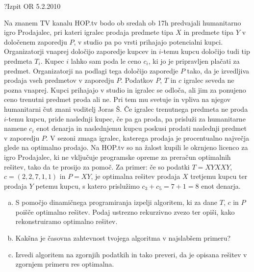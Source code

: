 \begin{naloga}{?}{Izpit OR 5.2.2010}
\begin{vprasanje}
Na znanem TV kanalu HOP.tv bodo ob sredah ob 17h
predvajali humanitarno igro Prodajalec\texttrademark,
pri kateri igralec prodaja predmete tipa $X$ in predmete tipa $Y$
v določenem zaporedju $P$,
v studio pa po vrsti prihajajo potencialni kupci.
Organizatorji vnaprej določijo zaporedje kupcev
in $i$-temu kupcu določijo tudi tip predmeta $T_i$.
Kupec $i$ lahko sam poda le ceno $c_i$,
ki jo je pripravljen plačati za predmet.
Organizatorji na podlagi tega določijo zaporedje $P$ tako,
da je izvedljiva prodaja vseh predmetov v zaporedju $P$.
Podatkov $P$, $T$ in $c$ igralec seveda ne pozna vnaprej.
Kupci prihajajo v studio in igralec se odloča,
ali jim za ponujeno ceno trenutni predmet proda ali ne.
Pri tem mu svetuje in vpliva na njegov humanitarni čut
znani voditelj Joras Š.
Če igralec trenutnega predmeta ne proda $i$-temu kupcu,
pride naslednji kupec, če pa ga proda,
pa prisluži za humanitarne namene $c_i$ enot denarja
in naslednjemu kupcu poskusi prodati naslednji predmet v zaporedju $P$.
V sezoni zmaga igralec,
katerega prodaja je procentualno največja glede na optimalno prodajo.
Na HOP.tv so na žalost kupili
le okrnjeno licenco za igro Prodajalec\texttrademark,
ki ne vključuje programske opreme za preračun optimalnih rešitev,
tako da te prosijo za pomoč.
Za primer: če so podatki $T = XYXXY$, $c = (2, 2, 7, 1, 1)$ in $P = XY$,
je optimalna rešitev prodaja $X$ tretjemu kupcu ter prodaja $Y$ petemu kupcu,
s katero prislužimo $c_3 + c_5 = 7 + 1 = 8$ enot denarja.

\begin{enumerate}[(a)]
\item S pomočjo dinamičnega programiranja izpelji algoritem,
ki za dane $T$, $c$ in $P$ poišče optimalno rešitev.
Podaj ustrezno rekurzivno zvezo ter opiši,
kako rekonstruiramo optimalno rešitev.

\item Kakšna je časovna zahtevnost tvojega algoritma v najslabšem primeru?

\item Izvedi algoritem na zgornjih podatkih in tako preveri,
da je opisana rešitev v zgornjem primeru res optimalna.
\end{enumerate}
\end{vprasanje}
\begin{odgovor}
\end{odgovor}
\end{naloga}


